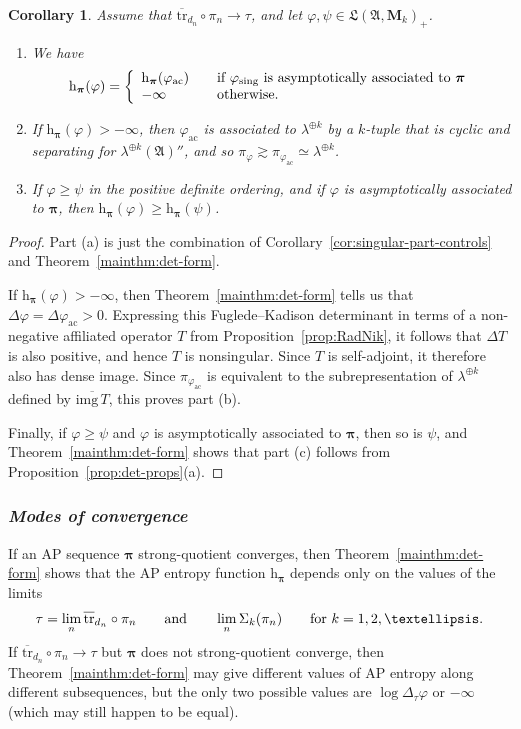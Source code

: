 \documentclass[12pt,a4paper]{article}
\numberwithin{equation}{section}
\newtheorem{cor}[thm]{Corollary}
\theoremstyle{remark}
\renewcommand{\rm}[1]{\mathrm{#1}}
\newcommand{\rmM}{\mathbf{M}}
\newcommand{\rmh}{\mathrm{h}}
\newcommand{\A}{\mathfrak{A}}
\newcommand{\frL}{\mathfrak{L}}
\renewcommand{\S}{\Sigma}
\renewcommand{\phi}{\varphi}
\renewcommand{\l}{\lambda}
\newcommand{\ol}[1]{\overline{#1}}
\newcommand{\bspi}{\boldsymbol{\pi}}
\newcommand{\tr}{\overline{\mathrm{tr}}}
\begin{document}
\begin{cor}\label{cor:det-form}
	Assume that $\tr_{d_n}\circ \pi_n \to \tau$, and let $\phi,\psi\in \frL(\A,\rmM_k)_+$.
	\begin{enumerate}
		\item[a.] We have
		\[\rmh_{\bspi}(\phi) = \left\{\begin{array}{ll}\rmh_{\bspi}(\phi_{\rm{ac}}) & \quad \hbox{if $\phi_{\rm{sing}}$ is asymptotically associated to $\bspi$}\\ -\infty & \quad \hbox{otherwise.} \end{array}\right.\]
		\item[b.] If $\rmh_{\bspi}(\phi) > -\infty$, then $\phi_{\rm{ac}}$ is associated to $\l^{\oplus k}$ by a $k$-tuple that is cyclic and separating for $\l^{\oplus k}(\A)''$, and so $\pi_\phi \gtrsim \pi_{\phi_{\rm{ac}}} \simeq \l^{\oplus k}$.
		\item[c.] If $\phi \ge \psi$ in the positive definite ordering, and if $\phi$ is asymptotically associated to $\bspi$, then $\rmh_{\bspi}(\phi) \ge \rmh_{\bspi}(\psi)$.
	\end{enumerate}
\end{cor}

\begin{proof}
Part (a) is just the combination of Corollary~\ref{cor:singular-part-controls} and Theorem~\ref{mainthm:det-form}.

If $\rmh_{\bspi}(\phi) > -\infty$, then Theorem~\ref{mainthm:det-form} tells us that $\Delta \phi = \Delta \phi_{\rm{ac}} > 0$.  Expressing this Fuglede--Kadison determinant in terms of a non-negative affiliated operator $T$ from Proposition~\ref{prop:RadNik}, it follows that $\Delta T$ is also positive, and hence $T$ is nonsingular.  Since $T$ is self-adjoint, it therefore also has dense image.  Since $\pi_{\phi_{\rm{ac}}}$ is equivalent to the subrepresentation of $\l^{\oplus k}$ defined by $\ol{\rm{img}\,T}$, this proves part (b).

Finally, if $\phi \ge \psi$ and $\phi$ is asymptotically associated to $\bspi$, then so is $\psi$, and Theorem~\ref{mainthm:det-form} shows that part (c) follows from Proposition~\ref{prop:det-props}(a).
\end{proof}

\subsubsection*{\emph{Modes of convergence}}

If an AP sequence $\bspi$ strong-quotient converges, then Theorem~\ref{mainthm:det-form} shows that the AP entropy function $\rmh_{\bspi}$ depends only on the values of the limits
\[\tau = \lim_n \tr_{d_n}\circ \pi_n \qquad \hbox{and} \qquad \lim_n \S_k(\pi_n) \qquad \hbox{for}\ k=1,2,\dots.\]
If $\tr_{d_n}\circ \pi_n \to \tau$ but $\bspi$ does not strong-quotient converge, then Theorem~\ref{mainthm:det-form} may give different values of AP entropy along different subsequences, but the only two possible values are $\log\Delta_\tau \phi$ or $-\infty$ (which may still happen to be equal).
\end{document}
